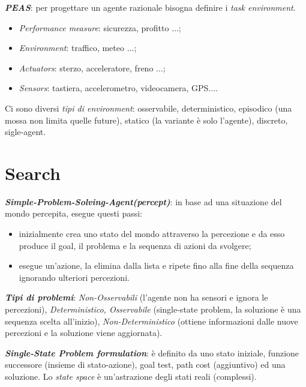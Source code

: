 \documentclass[a4paper, notitlepage, 9pt]{extreport}
\begin{document}
\noindent
\textit{\textbf{PEAS}}: per progettare un agente razionale bisogna definire i \textit{task environment}.
\begin{itemize}
	\item \textit{Performance measure}: sicurezza, profitto $\dots$;
	\item \textit{Environment}: traffico, meteo $\dots$;
	\item \textit{Actuators}: sterzo, acceleratore, freno $\dots$;
	\item \textit{Sensors}: tastiera, accelerometro, videocamera, GPS$\dots$.
\end{itemize}
Ci sono diversi \textit{tipi di environment}: osservabile, deterministico, episodico (una mossa non limita quelle future), statico (la variante è solo l'agente), discreto, sigle-agent.



\chapter*{Search}
\textit{\textbf{Simple-Problem-Solving-Agent(percept)}}: in base ad una situazione del mondo percepita, esegue questi passi:
\begin{itemize}
	\item inizialmente crea uno stato del mondo attraverso la percezione e da esso produce il goal, il problema e la sequenza di azioni da svolgere;
	\item esegue un'azione, la elimina dalla lista e ripete fino alla fine della sequenza ignorando ulteriori percezioni.
\end{itemize}
\textbf{\textit{Tipi di problemi}}: \textit{Non-Osservabili} (l'agente non ha sensori e ignora le percezioni), \textit{Deterministico, Osservabile} (single-state problem, la soluzione è una sequenza scelta all'inizio), \textit{Non-Deterministico} (ottiene informazioni dalle nuove percezioni e la soluzione viene aggiornata).
\newline

\noindent
\textit{\textbf{Single-State Problem formulation}}: è definito da uno stato iniziale, funzione successore (insieme di stato-azione), goal test, path cost (aggiuntivo) ed una soluzione. Lo \textit{state space} è un'astrazione degli stati reali (complessi).
\end{document}
